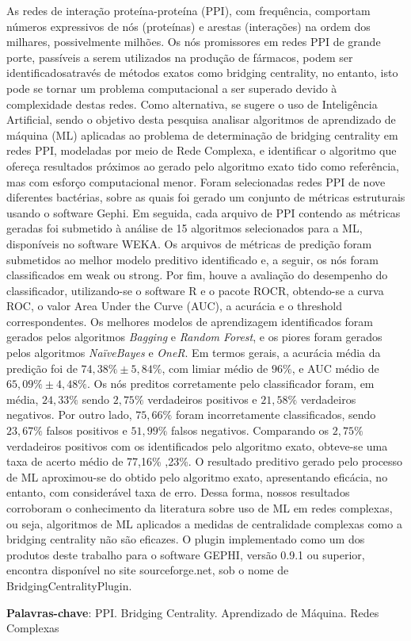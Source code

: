 \documentclass[
	12pt,				%
	twoside,			%
	a4paper,			%
	english,			%
	french,				%
	spanish,			%
	brazil				%
	]{abntex2}
\begin{document}
\setlength{\absparsep}{18pt} %
\begin{resumo}

  As redes de interação proteína-proteína (PPI), com frequência, comportam
  números expressivos de nós (proteínas) e arestas (interações) na ordem
  dos milhares, possivelmente milhões. Os nós promissores em redes PPI de
  grande porte, passíveis a serem utilizados na produção de fármacos,
  podem ser identificadosatravés de métodos exatos como bridging
  centrality, no entanto, isto pode se tornar um problema computacional a
  ser superado devido à complexidade destas redes. Como alternativa, se
  sugere o uso de Inteligência Artificial, sendo o objetivo desta pesquisa
  analisar algoritmos de aprendizado de máquina (ML) aplicadas ao problema
  de determinação de bridging centrality em redes PPI, modeladas por meio
  de Rede Complexa, e identificar o algoritmo que ofereça resultados
  próximos ao gerado pelo algoritmo exato tido como referência, mas com
  esforço computacional menor. Foram selecionadas redes PPI de nove
  diferentes bactérias, sobre as quais foi gerado um conjunto de métricas
  estruturais usando o software Gephi. Em seguida, cada arquivo de PPI
  contendo as métricas geradas foi submetido à análise de 15 algoritmos
  selecionados para a ML, disponíveis no software WEKA. Os arquivos de
  métricas de predição foram submetidos ao melhor modelo preditivo
  identificado e, a seguir, os nós foram classificados em weak ou strong.
  Por fim, houve a avaliação do desempenho do classificador, utilizando-se
  o software R e o pacote ROCR, obtendo-se a curva ROC, o valor Area Under
  the Curve (AUC), a acurácia e o threshold correspondentes. Os melhores
  modelos de aprendizagem identificados foram gerados pelos algoritmos
  \textit{Bagging} e \textit{Random Forest}, e os piores foram gerados
  pelos algoritmos \textit{NaïveBayes} e \textit{OneR}. Em termos gerais,
  a acurácia média da predição foi de \(74,38\% \pm 5,84\%\), com limiar
  médio de \(96\%\), e AUC médio de \(65,09\% \pm 4,48\%\). Os nós
  preditos corretamente pelo classificador foram, em média, \(24,33\%\)
  sendo \(2,75\%\) verdadeiros positivos e \(21,58\%\) verdadeiros
  negativos. Por outro lado, \(75,66\%\) foram incorretamente
  classificados, sendo \(23,67\%\) falsos positivos e \(51,99\%\) falsos
  negativos. Comparando os \(2,75\%\) verdadeiros positivos com os
  identificados pelo algoritmo exato, obteve-se uma taxa de acerto médio
  de 77,16\% ,23\%. O resultado preditivo gerado pelo processo de ML
  aproximou-se do obtido pelo algoritmo exato, apresentando eficácia, no
  entanto, com considerável taxa de erro. Dessa forma, nossos resultados
  corroboram o conhecimento da literatura sobre uso de ML em redes
  complexas, ou seja, algoritmos de ML aplicados a medidas de centralidade
  complexas como a bridging centrality não são eficazes. O plugin
  implementado como um dos produtos deste trabalho para o software GEPHI,
  versão 0.9.1 ou superior, encontra disponível no site sourceforge.net,
  sob o nome de BridgingCentralityPlugin.

 \textbf{Palavras-chave}: PPI. Bridging Centrality. Aprendizado de Máquina. Redes Complexas
\end{resumo}
\end{document}
